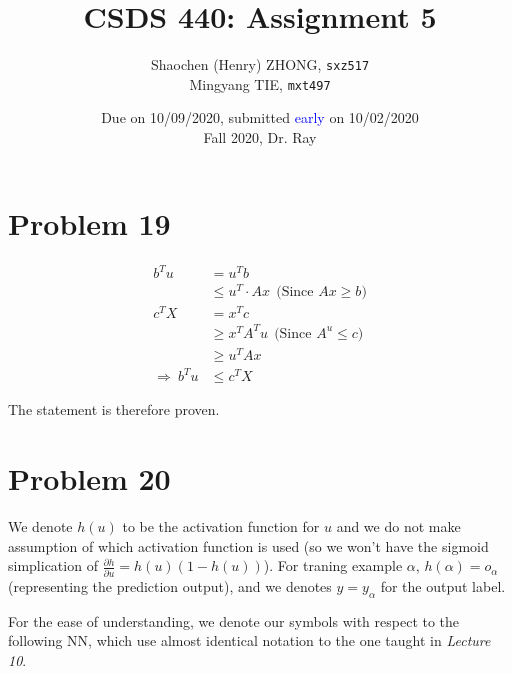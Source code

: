 \documentclass[12pt]{article}
\newcommand{\ilcode}{\texttt}
\begin{document}
\title{\textbf{CSDS 440: Assignment 5}}

\author{Shaochen (Henry) ZHONG, \ilcode{sxz517} \\ Mingyang TIE, \ilcode{mxt497}}
\date{Due on 10/09/2020, submitted \textcolor{blue}{early} on 10/02/2020 \\ Fall 2020, Dr. Ray}
\maketitle


\section{Problem 19}

\begin{align*}
    b^T u &= u^T b \\
    &\leq u^T \cdot Ax \ \ \text{(Since $Ax \geq b$)}\\
    c^T X &= x^T c \\
    &\geq x^T A^T u \ \ \text{(Since $A^u \leq c$)}\\
    &\geq u^T Ax \\
    \Longrightarrow \ b^T u &\leq c^T X
\end{align*}

The statement is therefore proven.

\section{Problem 20}


We denote $h(u)$ to be the activation function for $u$ and we do not make assumption of which activation function is used (so we won't have the sigmoid simplication of $\frac{\partial h}{\partial u} = h(u)(1-h(u))$). For traning example $\alpha$, $h(\alpha) = o_\alpha$ (representing the prediction output), and we denotes $y = y_\alpha$ for the output label.

For the ease of understanding, we denote our symbols with respect to the following NN, which use almost identical notation to the one taught in \textit{Lecture 10}.\newline
\end{document}
